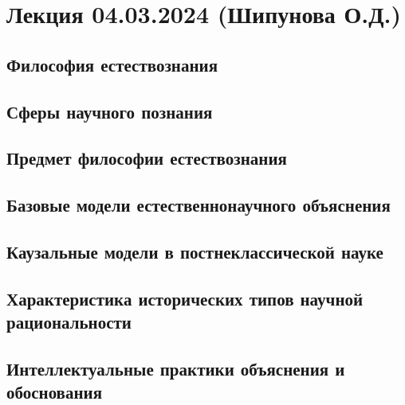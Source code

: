 \documentclass[main.tex]{subfiles}
\begin{document}
\section{Лекция 04.03.2024 (Шипунова О.Д.)}

\subsection{Философия естествознания}


\subsection{Сферы научного познания}


\subsection{Предмет философии естествознания}



\subsection{Базовые модели естественнонаучного объяснения}



\subsection{Каузальные модели в постнеклассической науке}



\subsection{Характеристика исторических типов научной рациональности}


\subsection{Интеллектуальные практики объяснения и обоснования}
\end{document}
